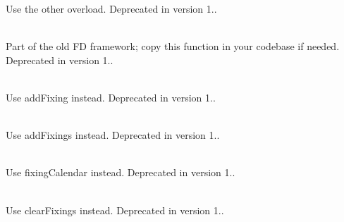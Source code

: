 \begin{DoxyRefList}
\label{deprecated__deprecated000002}%
%
Use the other overload. Deprecated in version 1..  
\item[Member \doxylink{namespace_quant_lib_ab026984ace9e25d8d9bcc52d5a7e94ab}{Quant\+Lib\+::Centered\+Grid} (\doxylink{namespace_quant_lib_a372ac5c1a422a6b276fe0552d4d83f50}{Real} center, \doxylink{namespace_quant_lib_a372ac5c1a422a6b276fe0552d4d83f50}{Real} dx, \doxylink{namespace_quant_lib_af4cc4ef40b52c17cc455ead2a97aedb3}{Size} steps)]\hfill \\
\label{deprecated__deprecated000044}%
%
Part of the old FD framework; copy this function in your codebase if needed. Deprecated in version 1..  
\item[Member \doxylink{class_quant_lib_1_1_commodity_index_ad6bffbb598d82cee9c45e070628a7ba1}{Quant\+Lib\+::Commodity\+Index\+::add\+Quote} (const \doxylink{class_quant_lib_1_1_date}{Date} \&quote\+Date, \doxylink{namespace_quant_lib_a372ac5c1a422a6b276fe0552d4d83f50}{Real} quote)]\hfill \\
\label{deprecated__deprecated000016}%
%
Use add\+Fixing instead. Deprecated in version 1..  
\item[Member \doxylink{class_quant_lib_1_1_commodity_index_ae4a98bc7625a3df0724946b1486ceb4a}{Quant\+Lib\+::Commodity\+Index\+::add\+Quotes} (const std\+::map$<$ Date, Real $>$ \&quotes)]\hfill \\
\label{deprecated__deprecated000017}%
%
Use add\+Fixings instead. Deprecated in version 1..  
\item[Member \doxylink{class_quant_lib_1_1_commodity_index_afbd1ab281834f479e26c3cfdd09377ac}{Quant\+Lib\+::Commodity\+Index\+::calendar} () const]\hfill \\
\label{deprecated__deprecated000014}%
%
Use fixing\+Calendar instead. Deprecated in version 1..  
\item[Member \doxylink{class_quant_lib_1_1_commodity_index_af45bf0bb5242cec93c176c1d30d5df1f}{Quant\+Lib\+::Commodity\+Index\+::clear\+Quotes} ()]\hfill \\
\label{deprecated__deprecated000018}%
%
Use clear\+Fixings instead. Deprecated in version 1..  
\item[Member \doxylink{class_quant_lib_1_1_commodity_index_a419a9dbb0e3ac2e5f56e0159efd04996}{Quant\+Lib\+::Commodity\+Index\+::is\+Valid\+Quote\+Date} (const \doxylink{class_quant_lib_1_1_date}{Date} \&quote\+Date) const]\hfill \\

\end{DoxyRefList}
